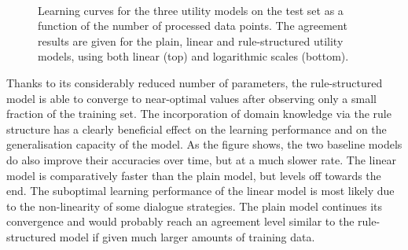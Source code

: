 \begin{figure}[p!]
\begin{center}\end{center} $\phantom{a}$\vspace{8mm}$\phantom{a}$ 
\begin{center}\end{center}
\caption{Learning curves for the three utility models on the test set as a function of the number of processed data points.  The agreement results are given for the plain, linear and rule-structured utility models, using both linear (top) and logarithmic scales (bottom).}
\label{results}
\end{figure}


Thanks to its considerably reduced number of parameters, the rule-structured model is able to converge to near-optimal values after observing only a small fraction of the training set.  The incorporation of domain knowledge via the rule structure has a clearly beneficial effect on the learning performance and on the generalisation capacity of the model.  As the figure shows, the two baseline models do also improve their accuracies over time, but at a much slower rate.   The linear model is comparatively faster than the plain model, but levels off towards the end. The suboptimal learning performance of the linear model is most likely due to the non-linearity of some dialogue strategies.  The plain model continues its convergence and would probably reach an agreement level similar to the rule-structured model if given much larger amounts of training data. 

